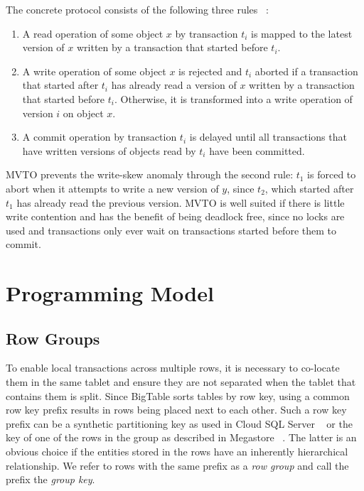 \documentclass[10pt,final,journal]{IEEEtran}
\begin{document}
The concrete protocol consists of the following three rules ~\cite{Weikum:2001:TIS}:
\begin{enumerate}
\item A read operation of some object $x$ by transaction $t_i$ is mapped to the latest version of $x$ written by a transaction that started before $t_i$.
\item A write operation of some object $x$ is rejected and $t_i$ aborted if a transaction that started after $t_i$ has already read a version of $x$ written by a transaction that started before $t_i$. Otherwise, it is transformed into a write operation of version $i$ on object $x$.
\item A commit operation by transaction $t_i$ is delayed until all transactions that have written versions of objects read by $t_i$ have been committed.
\end{enumerate}

MVTO prevents the write-skew anomaly through the second rule: $t_1$ is forced to abort when it attempts to write a new version of $y$, since $t_2$, which started after $t_1$ has already read the previous version. MVTO is well suited if there is little write contention and has the benefit of being deadlock free, since no locks are used and transactions only ever wait on transactions started before them to commit.

\section{Programming Model}

\subsection{Row Groups}
To enable local transactions across multiple rows, it is necessary to co-locate them in the same tablet and ensure they are not separated when the tablet that contains them is split. Since BigTable sorts tables by row key, using a common row key prefix results in rows being placed next to each other. Such a row key prefix can be a synthetic partitioning key as used in Cloud SQL Server ~\cite{Bernstein:2011:AMS:2004686.2005651} or the key of one of the rows in the group as described in Megastore ~\cite{Baker:2011:8530095}. The latter is an obvious choice if the entities stored in the rows have an inherently hierarchical relationship. We refer to rows with the same prefix as a \emph{row group} and call the prefix the \emph{group key}.
\end{document}

